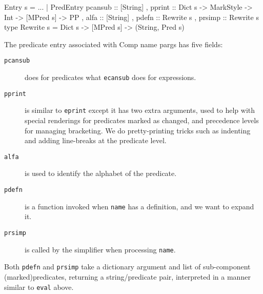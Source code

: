 \begin{code}
Entry s
  = ...
  | PredEntry
    { pcansub :: [String]
    , pprint :: Dict s -> MarkStyle -> Int -> [MPred s] -> PP
    , alfa :: [String]
    , pdefn :: Rewrite s
    , prsimp :: Rewrite s }
type Rewrite s = Dict s -> [MPred s] -> (String, Pred s)
\end{code}
The predicate entry associated with Comp name pargs
has five fields:
\begin{description}
  \item[\texttt{pcansub}]
    does for predicates what \texttt{ecansub} does for expressions.
  \item[\texttt{pprint}]
    is similar to \texttt{eprint} except it has two extra arguments,
    used to help with special renderings for predicates marked as changed,
    and precedence levels for managing bracketing.
    We do pretty-printing tricks such as indenting and adding line-breaks
    at the predicate level.
  \item[\texttt{alfa}]
    is used to identify the alphabet of the predicate.
  \item[\texttt{pdefn}]
    is a function invoked when \texttt{name} has a definition,
    and we want to expand it.
  \item[\texttt{prsimp}]
    is called by the simplifier when processing \texttt{name}.
\end{description}
Both \texttt{pdefn} and \texttt{prsimp} take a dictionary argument
and list of sub-component (marked)predicates,
returning a string/predicate pair,
interpreted in a manner similar to \texttt{eval} above.
